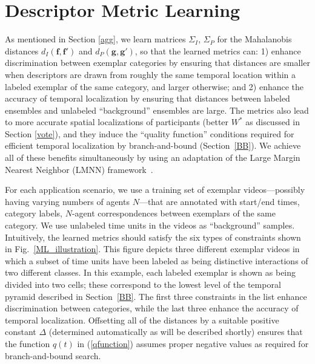 
\section{Descriptor Metric Learning}
\label{MetLearn}

As mentioned in Section \ref{agg}, we learn matrices $\Sigma_{I}$, $\Sigma_{P}$ for the Mahalanobis distances $d_I(\mathbf{f},\mathbf{f}')$ and $d_P(\mathbf{g},\mathbf{g}')$, so that the learned metrics can: 1) enhance discrimination between exemplar categories by ensuring that distances are smaller when descriptors are drawn from roughly the same temporal location within a labeled exemplar of the same category, and larger otherwise; and 2) enhance the accuracy of temporal localization by ensuring that distances between labeled ensembles and unlabeled ``background'' ensembles are large. The metrics also lead to more accurate spatial localizations of participants (\ie better $W^{*}$ as discussed in Section \ref{vote}), and they induce the ``quality function'' conditions required for efficient temporal localization by branch-and-bound (Section~\ref{BB}). We achieve all of these benefits simultaneously by using an adaptation of the Large Margin Nearest Neighbor (LMNN) framework~\cite{Weinberger:ML}. 

For each application scenario, we use a training set of exemplar videos---possibly having varying numbers of agents $N$---that are annotated with start/end times, category labels, $N$-agent correspondences between exemplars of the same category. We use unlabeled time units in the videos as ``background'' samples. Intuitively, the learned metrics should satisfy the six types of constraints shown in Fig.~\ref{ML_illustration}. This figure depicts three different exemplar videos in which a subset of time units have been labeled as being distinctive interactions of two different classes. In this example, each labeled exemplar is shown as being divided into two cells; these correspond to the lowest level of the temporal pyramid described in Section~\ref{BB}. The first three constraints in the list enhance discrimination between categories, while the last three enhance the accuracy of temporal localization. Offsetting all of the distances by a suitable positive constant $\Delta$ (determined automatically as will be described shortly) ensures that the function $q(t)$ in (\ref{qfunction}) assumes proper negative values as required for branch-and-bound search. 

